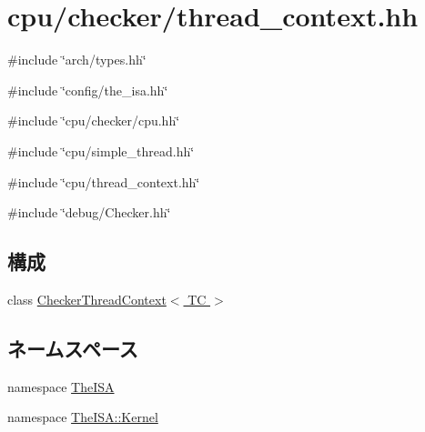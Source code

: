 \hypertarget{checker_2thread__context_8hh}{
\section{cpu/checker/thread\_\-context.hh}
\label{checker_2thread__context_8hh}
}
{\ttfamily \#include \char`\"{}arch/types.hh\char`\"{}}\par
{\ttfamily \#include \char`\"{}config/the\_\-isa.hh\char`\"{}}\par
{\ttfamily \#include \char`\"{}cpu/checker/cpu.hh\char`\"{}}\par
{\ttfamily \#include \char`\"{}cpu/simple\_\-thread.hh\char`\"{}}\par
{\ttfamily \#include \char`\"{}cpu/thread\_\-context.hh\char`\"{}}\par
{\ttfamily \#include \char`\"{}debug/Checker.hh\char`\"{}}\par
\subsection*{構成}
\begin{DoxyCompactItemize}
\item 
class \hyperlink{classCheckerThreadContext}{CheckerThreadContext$<$ TC $>$}
\end{DoxyCompactItemize}
\subsection*{ネームスペース}
\begin{DoxyCompactItemize}
\item 
namespace \hyperlink{namespaceTheISA}{TheISA}
\item 
namespace \hyperlink{namespaceTheISA_1_1Kernel}{TheISA::Kernel}
\end{DoxyCompactItemize}
